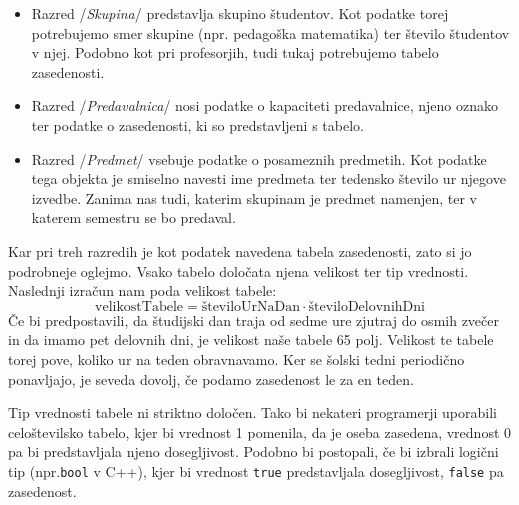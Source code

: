 \documentclass[a4paper, 10pt]{article}
\begin{document}

\begin{itemize}
   \item Razred /\emph{Skupina}/ predstavlja skupino študentov. Kot podatke torej potrebujemo
   smer skupine (npr. pedagoška matematika) ter število študentov v njej. Podobno kot pri
   profesorjih, tudi tukaj potrebujemo tabelo zasedenosti.
   \item Razred /\emph{Predavalnica}/ nosi podatke o kapaciteti predavalnice, njeno oznako ter 
   podatke o zasedenosti, ki so predstavljeni s tabelo.
   \item Razred /\emph{Predmet}/ vsebuje podatke o posameznih predmetih. Kot podatke tega
   objekta je smiselno navesti ime predmeta ter tedensko število ur njegove izvedbe.
   Zanima nas tudi, katerim skupinam je predmet namenjen, ter v katerem semestru se bo
   predaval.
\end{itemize}

Kar pri treh razredih je kot podatek navedena tabela zasedenosti, zato si jo podrobneje
oglejmo. Vsako tabelo določata njena velikost ter tip vrednosti. Naslednji izračun nam
poda velikost tabele:
\[ \text{velikostTabele} = \text{številoUrNaDan} \cdot \text{številoDelovnihDni} \]
Če bi predpostavili, da študijski dan traja od sedme ure zjutraj do osmih zvečer in da
imamo pet delovnih dni, je velikost naše tabele 65 polj. Velikost te tabele torej pove,
koliko ur na teden obravnavamo. Ker se šolski tedni periodično ponavljajo, je seveda
dovolj, če podamo zasedenost le za en teden.


Tip vrednosti tabele ni striktno določen. Tako bi nekateri programerji uporabili
celoštevilsko tabelo, kjer bi vrednost 1 pomenila, da je oseba zasedena, vrednost 0
pa bi predstavljala njeno dosegljivost. Podobno bi postopali, če bi izbrali logični
tip (npr.\texttt{bool} v C++), kjer bi vrednost \texttt{true} predstavljala
dosegljivost, \texttt{false} pa zasedenost.
\end{document}
